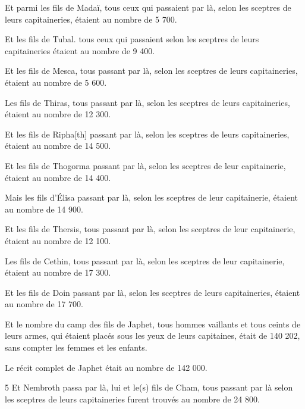 \par Et parmi les fils de Madaï, tous ceux qui passaient par là, selon les sceptres de leurs capitaineries, étaient au nombre de 5 700.

\par Et les fils de Tubal. tous ceux qui passaient selon les sceptres de leurs capitaineries étaient au nombre de 9 400.

\par Et les fils de Mesca, tous passant par là, selon les sceptres de leurs capitaineries, étaient au nombre de 5 600.

\par Les fils de Thiras, tous passant par là, selon les sceptres de leurs capitaineries, étaient au nombre de 12 300.

\par Et les fils de Ripha[th] passant par là, selon les sceptres de leurs capitaineries, étaient au nombre de 14 500.

\par Et les fils de Thogorma passant par là, selon les sceptres de leur capitainerie, étaient au nombre de 14 400.

\par Mais les fils d'Élisa passant par là, selon les sceptres de leur capitainerie, étaient au nombre de 14 900.

\par Et les fils de Thersis, tous passant par là, selon les sceptres de leur capitainerie, étaient au nombre de 12 100.

\par Les fils de Cethin, tous passant par là, selon les sceptres de leur capitainerie, étaient au nombre de 17 300.

\par Et les fils de Doin passant par là, selon les sceptres de leurs capitaineries, étaient au nombre de 17 700.

\par Et le nombre du camp des fils de Japhet, tous hommes vaillants et tous ceints de leurs armes, qui étaient placés sous les yeux de leurs capitaines, était de 140 202, sans compter les femmes et les enfants.

\par Le récit complet de Japhet était au nombre de 142 000.

\par 5 Et Nembroth passa par là, lui et le(s) fils de Cham, tous passant par là selon les sceptres de leurs capitaineries furent trouvés au nombre de 24 800.

